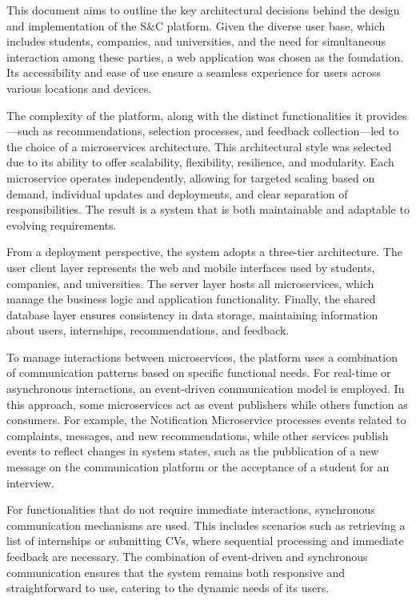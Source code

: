 This document aims to outline the key architectural decisions behind the design and implementation of
the S\&C platform. Given the diverse user base, which includes students, companies, and universities,
and the need for simultaneous interaction among these parties, a web application was chosen as the
foundation. Its accessibility and ease of use ensure a seamless experience for users across various
locations and devices.

The complexity of the platform, along with the distinct functionalities it provides—such as recommendations,
selection processes, and feedback collection—led to the choice of a microservices architecture.
This architectural style was selected due to its ability to offer scalability, flexibility, resilience,
and modularity. Each microservice operates independently, allowing for targeted scaling based on
demand, individual updates and deployments, and clear separation of responsibilities.
The result is a system that is both maintainable and adaptable to evolving requirements.

From a deployment perspective, the system adopts a three-tier architecture. The user client
layer represents the web and mobile interfaces used by students, companies, and universities.
The server layer hosts all microservices, which manage the business logic and application
functionality. Finally, the shared database layer ensures consistency in data storage,
maintaining information about users, internships, recommendations, and feedback.

To manage interactions between microservices, the platform uses a combination of communication
patterns based on specific functional needs. For real-time or asynchronous interactions, an
event-driven communication model is employed. In this approach, some microservices act as event
publishers while others function as consumers. For example, the Notification Microservice processes
events related to complaints, messages, and new recommendations, while other services publish events
to reflect changes in system states, such as the pubblication of a new message on the communication platform
or the acceptance of a student for an interview.
 
For functionalities that do not require immediate interactions, synchronous communication mechanisms
are used. This includes scenarios such as retrieving a list of internships or submitting CVs, where
sequential processing and immediate feedback are necessary. The combination of event-driven and
synchronous communication ensures that the system remains both responsive and straightforward to
use, catering to the dynamic needs of its users.

